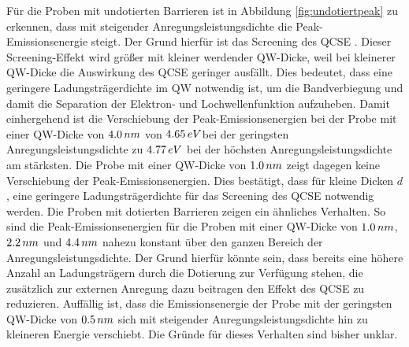\noindent 
Für die Proben mit undotierten Barrieren ist in Abbildung \ref{fig:undotiertpeak} zu erkennen, dass mit steigender Anregungsleistungsdichte die Peak-Emissionsenergie steigt. Der Grund hierfür ist das Screening des QCSE \cite{doi:10.1063/1.1763211}. Dieser Screening-Effekt wird größer mit kleiner werdender QW-Dicke, weil bei kleinerer QW-Dicke die Auswirkung des QCSE geringer ausfällt. Dies bedeutet, dass eine geringere Ladungsträgerdichte im QW notwendig ist, um die Bandverbiegung und damit die Separation der Elektron- und Lochwellenfunktion aufzuheben. 
\newline
Damit einhergehend ist die Verschiebung der Peak-Emissionsenergien bei der Probe mit einer QW-Dicke von $4.0 \thinspace nm$ von $4.65 \thinspace eV$bei der geringsten Anregungsleistungsdichte zu $4.77 \thinspace eV$ bei der höchsten Anregungsleistungsdichte am stärksten. 
\newline 
Die Probe mit einer QW-Dicke von $1.0 \thinspace nm$ zeigt dagegen keine Verschiebung der Peak-Emissionsenergien. Dies bestätigt, dass für kleine Dicken $d$, eine geringere Ladungsträgerdichte für das Screening des QCSE notwendig werden.
\newline
Die Proben mit dotierten Barrieren zeigen ein ähnliches Verhalten. So sind die Peak-Emissionsenergien für die Proben mit einer QW-Dicke von 
$1.0 \thinspace nm$, $2.2 \thinspace nm$ und $4.4 \thinspace nm$ nahezu konstant über den ganzen Bereich der Anregungsleistungsdichte.
Der Grund hierfür könnte sein, dass bereits eine höhere Anzahl an Ladungsträgern durch die Dotierung zur Verfügung stehen, die zusätzlich zur  externen Anregung dazu beitragen den Effekt des QCSE zu reduzieren.
\newline
Auffällig ist, dass die Emissionsenergie der Probe mit der geringsten QW-Dicke von $0.5 \thinspace nm$ sich mit steigender Anregungsleistungsdichte hin zu kleineren Energie verschiebt. Die Gründe für dieses Verhalten sind bisher unklar.
